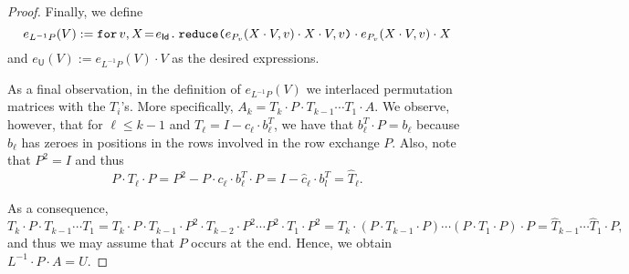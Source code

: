\begin{proof}
    Finally, we define
    $$
    e_{L^{-1}P}(V):=\initf{e_{\mathsf{Id}}}{v}{X}{\red{e_{P_v}(X\cdot V,v)\cdot X\cdot V}{v}\cdot e_{P_v}(X\cdot V,v)\cdot X}
    $$
    and $e_{\mathsf{U}}(V):=e_{L^{-1}P}(V)\cdot V$ as the desired expressions.

    As a final observation, in the definition of $e_{L^{-1}P}(V)$ 
    we interlaced permutation matrices with the $T_i$'s. More specifically, 
    $A_k=T_k\cdot P\cdot T_{k-1}\cdots T_1\cdot A$. We observe, however, that for $\ell\leq k-1$ and
    $T_{\ell}=I-c_\ell\cdot b_\ell^T$, we have that  $b_\ell^T\cdot P=b_\ell$ because $b_\ell$ has zeroes in positions in the rows involved in the row exchange $P$. Also, note that  $P^2=I$ and thus 
    $$P\cdot T_\ell\cdot P=P^2-P\cdot c_\ell\cdot b_\ell^T\cdot P=I-\widehat{c}_\ell\cdot b_l^T=\widehat{T}_\ell.$$

    As a consequence,
    $$
    T_k\cdot P\cdot T_{k-1}\cdots T_1=T_k\cdot P\cdot T_{k-1}\cdot P^2\cdot T_{k-2}\cdot P^2\cdots P^2 \cdot T_1\cdot P^2=T_k\cdot (P\cdot T_{k-1}\cdot P)\cdots (P\cdot T_1\cdot P)\cdot P=\widehat{T}_{k-1}\cdots \widehat{T}_1\cdot P,
    $$
    and thus we may assume that $P$ occurs at the end. Hence, we obtain $L^{-1}\cdot P\cdot A=U$.

\end{proof}
